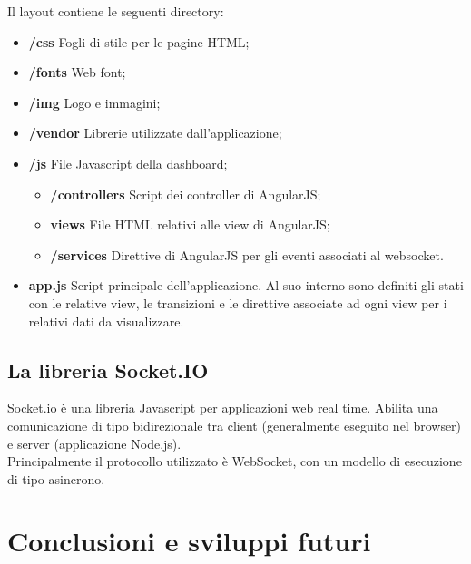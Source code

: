 \documentclass[11pt]{article}
\begin{document}
Il layout contiene le seguenti directory: 
\begin{itemize}
	\item \textbf{/css} Fogli di stile per le pagine HTML;
	\item \textbf{/fonts} Web font;
	\item \textbf{/img} Logo e immagini;
	\item \textbf{/vendor} Librerie utilizzate dall'applicazione;
	\item \textbf{/js} File Javascript della dashboard;
	\begin{itemize}
		\item \textbf{/controllers} Script dei controller di AngularJS;
		\item \textbf{views} File HTML relativi alle view di AngularJS;
		\item \textbf{/services} Direttive di AngularJS per gli eventi associati al websocket.
	\end{itemize}
	\item \textbf{app.js} Script principale dell'applicazione. Al suo interno sono definiti gli stati con le relative view, le transizioni e le direttive associate ad ogni view per i relativi dati da visualizzare.
\end{itemize}

\subsection{La libreria Socket.IO}

Socket.io è una libreria Javascript per applicazioni web real time. Abilita una comunicazione di tipo bidirezionale tra client (generalmente eseguito nel browser) e server (applicazione Node.js).\\

Principalmente il protocollo utilizzato è WebSocket, con un modello di esecuzione di tipo asincrono.  


\section{Conclusioni e sviluppi futuri}

\clearpage
{}
\nocite{*}



\newpage
\end{document}
